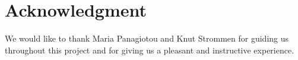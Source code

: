 
\section{Acknowledgment}
We would like to thank Maria Panagiotou and Knut Strommen for guiding us throughout this project and for giving us a pleasant and instructive experience.
